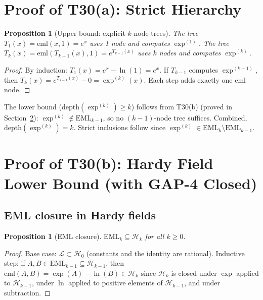 \documentclass[12pt,a4paper]{article}
\newtheorem{proposition}[theorem]{Proposition}
\theoremstyle{definition}
\theoremstyle{remark}
\begin{document}
\section{Proof of T30(a): Strict Hierarchy}

\begin{proposition}[Upper bound: explicit $k$-node trees]\label{prop:ub}
The tree $T_1(x) = \mathrm{eml}(x,1) = e^x$ uses 1 node and computes $\exp^{(1)}$.
The tree $T_k(x) = \mathrm{eml}(T_{k-1}(x), 1) = e^{T_{k-1}(x)}$ uses $k$ nodes
and computes $\exp^{(k)}$.
\end{proposition}
\begin{proof}
By induction: $T_1(x) = e^x - \ln(1) = e^x$.
If $T_{k-1}$ computes $\exp^{(k-1)}$, then $T_k(x) = e^{T_{k-1}(x)} - 0 = \exp^{(k)}(x)$.
Each step adds exactly one $\mathrm{eml}$ node.
\end{proof}

The lower bound ($\mathrm{depth}(\exp^{(k)}) \geq k$) follows from T30(b)
(proved in Section~\ref{sec:hardy}): $\exp^{(k)} \notin \mathrm{EML}_{k-1}$,
so no $(k-1)$-node tree suffices.  Combined, $\mathrm{depth}(\exp^{(k)}) = k$.
Strict inclusions follow since $\exp^{(k)} \in \mathrm{EML}_k \setminus \mathrm{EML}_{k-1}$.

\section{Proof of T30(b): Hardy Field Lower Bound (with GAP-4 Closed)}
\label{sec:hardy}

\subsection{EML closure in Hardy fields}

\begin{proposition}[EML closure]\label{prop:closure}
$\mathrm{EML}_k \subseteq \mathcal{H}_k$ for all $k \geq 0$.
\end{proposition}
\begin{proof}
Base case: $\mathcal{L} \subset \mathcal{H}_0$ (constants and the identity are rational).
Inductive step: if $A, B \in \mathrm{EML}_{k-1} \subseteq \mathcal{H}_{k-1}$, then
$\mathrm{eml}(A,B) = \exp(A) - \ln(B) \in \mathcal{H}_k$ since $\mathcal{H}_k$ is
closed under $\exp$ applied to $\mathcal{H}_{k-1}$, under $\ln$ applied to positive
elements of $\mathcal{H}_{k-1}$, and under subtraction.
\end{proof}
\end{document}
